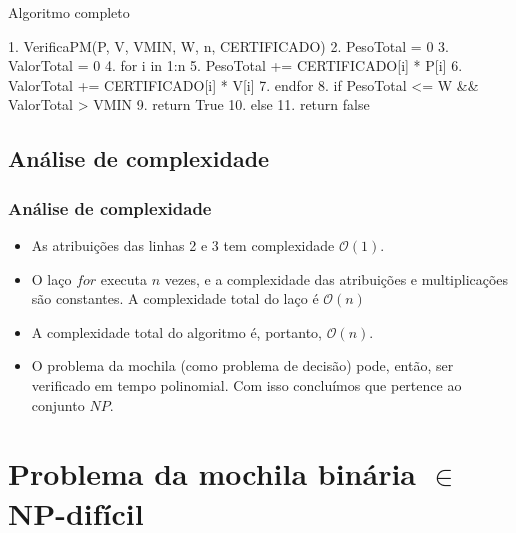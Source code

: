 \documentclass{beamer}
\begin{document}
\begin{frame}[fragile]
    \begin{block}{Algoritmo completo}
        \begin{semiverbatim}
        1. VerificaPM(P, V, VMIN, W, n, CERTIFICADO)
        2.    PesoTotal = 0
        3.    ValorTotal = 0
        4.    for i in 1:n
        5.        PesoTotal += CERTIFICADO[i] * P[i]
        6.        ValorTotal += CERTIFICADO[i] * V[i]
        7.    endfor
        8.    if PesoTotal <= W && ValorTotal > VMIN
        9.        return True
        10.    else
        11.       return false
        \end{semiverbatim}
    \end{block}

\end{frame}

\subsection{Análise de complexidade}
\begin{frame}
    \frametitle{Análise de complexidade}

    \begin{itemize}
        \item As atribuições das linhas 2 e 3 tem complexidade $\mathcal{O}(1)$.

        \item O laço $for$ executa $n$ vezes, e a complexidade das atribuições e multiplicações são constantes.
            A complexidade total do laço é $\mathcal{O}(n)$

        \item A complexidade total do algoritmo é, portanto, $\mathcal{O}(n)$.
        \item O problema da mochila (como problema de decisão) pode, então, ser verificado em tempo polinomial.
              Com isso concluímos que pertence ao conjunto $NP$.
    \end{itemize}

\end{frame}


\section{Problema da mochila binária $\in$ NP-difícil}
\end{document}
